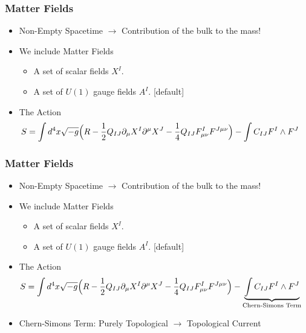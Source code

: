 \documentclass[t]{beamer}
\begin{document}
\begin{frame}
\frametitle{Matter Fields}

\begin{itemize}
\setlength{\parskip}{10pt}

\item<1-> Non-Empty Spacetime $\rightarrow$ Contribution of the bulk to the mass!

\item<2-> We include Matter Fields
\begin{itemize}
[triangle]
\setlength{\parskip}{5pt}
\item A set of scalar fields $X^I$.
\item A set of $U(1)$ gauge fields $A^I$.
[default]
\setlength{\parskip}{10pt}
\end{itemize}

\item<3-> The Action
\vspace{0.9em}
{\small
\begin{align}
S = \int d^4x \sqrt{-g} \Big( R &- \frac{1}{2} Q_{IJ} \partial_\mu X^I \partial^\mu X^J - \frac{1}{4} Q_{IJ} F^I_{\mu\nu}  F^{J \mu\nu} \Big) - \int C_{IJ} F^I \wedge F^J \notag
\end{align}}

\end{itemize}
\end{frame}



\begin{frame}
\frametitle{Matter Fields}

\begin{itemize}
\setlength{\parskip}{10pt}

\item Non-Empty Spacetime $\rightarrow$ Contribution of the bulk to the mass!

\item We include Matter Fields
\begin{itemize}
[triangle]
\setlength{\parskip}{5pt}
\item A set of scalar fields $X^I$.
\item A set of $U(1)$ gauge fields $A^I$.
[default]
\setlength{\parskip}{10pt}
\end{itemize}

\item The Action
\vspace{0.9em}
{\small
\begin{align}
S = \int d^4x \sqrt{-g} \Big( R &- \frac{1}{2} Q_{IJ} \partial_\mu X^I \partial^\mu X^J - \frac{1}{4} Q_{IJ} F^I_{\mu\nu}  F^{J \mu\nu} \Big) - \underbrace{\int C_{IJ} F^I \wedge F^J}_{\text{Chern-Simons Term}} \notag
\end{align}}

\item Chern-Simons Term: Purely Topological $\rightarrow$ Topological Current

\end{itemize}
\end{frame}
\end{document}
